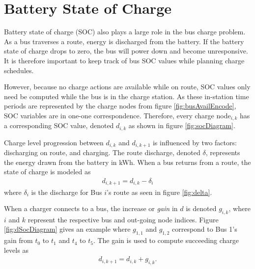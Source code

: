 \section{Battery State of Charge}
Battery state of charge (SOC) also plays a large role in the bus charge problem. As a bus traverses a route, energy is discharged from the battery. If the battery state of charge drops to zero, the bus will power down and become unresponsive. It is therefore important to keep track of bus SOC values while planning charge schedules. 
\par However, because no charge actions are available while on route, SOC values only need be computed while the bus is in the charge station. As these in-station time periods are represented by the charge nodes from figure \ref{fig:busAvailEncode}, SOC variables are in one-one correspondence. Therefore, every charge node$_{i,k}$ has a corresponding SOC value, denoted $d_{i,k}$ as shown in figure \ref{fig:socDiagram}.
\par Charge level progression between $d_{i,k}$ and $d_{i,k+1}$ is influenced by two factors: discharging on route, and charging. The route discharge, denoted $\delta$, represents the energy drawn from the battery in kWh.  When a bus returns from a route, the state of charge is modeled as 
\begin{align}
	d_{i,k+1} = d_{i,k} - \delta_i
\end{align}
where $\delta_i$ is the discharge for Bus $i$'s route as seen in figure \ref{fig:delta}.
\par When a charger connects to a bus, the increase or \textit{gain} in $d$ is denoted $g_{i,k}$, where $i$ and $k$ represent the respective bus and out-going node indices. Figure \ref{fig:dSocDiagram} gives an example where $g_{1,1}$ and $g_{1,2}$ correspond to Bus 1's gain from $t_0$ to $t_1$ and $t_4$ to $t_5$. The gain is used to compute succeeding charge levels as 
\begin{align}\label{eqn:gainInitial}
	d_{i,k+1} = d_{i,k} + g_{i,k}.
\end{align} 

